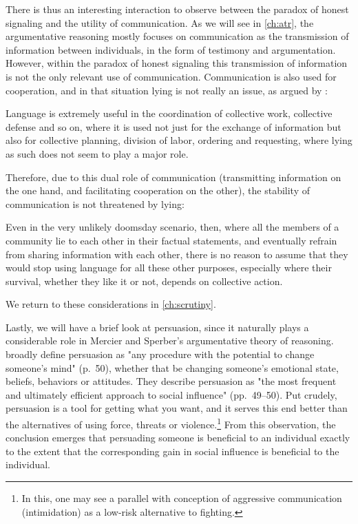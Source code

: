 There is thus an interesting interaction to observe between the paradox of honest signaling and the utility of communication. As we will see in \cref{ch:atr}, the argumentative reasoning mostly focuses on communication as the transmission of information between individuals, in the form of testimony and argumentation. However, within the paradox of honest signaling this transmission of information is not the only relevant use of communication. Communication is also used for cooperation, and in that situation lying is not really an issue, as argued by \citet{Dor17}:
\begin{quoting}
    Language is extremely useful in the coordination of collective work, collective defense and so on, where it is used not just for the exchange of information but also for collective planning, division of labor, ordering and requesting, where lying as such does not seem to play a major role.
\end{quoting}
Therefore, due to this dual role of communication (transmitting information on the one hand, and facilitating cooperation on the other), the stability of communication is not threatened by lying:
\begin{quoting}
    Even in the very unlikely doomsday scenario, then, where all the members of a community lie to each other in their factual statements, and eventually refrain from sharing information with each other, there is no reason to assume that they would stop using language for all these other purposes, especially where their survival, whether they like it or not, depends on collective action.
\end{quoting}
We return to these considerations in \cref{ch:scrutiny}.

Lastly, we will have a brief look at persuasion, since it naturally plays a considerable role in Mercier and Sperber's argumentative theory of reasoning.
\citet{Brinol09} broadly define persuasion as "any procedure with the potential to change someone's mind" (p.~50),
whether that be changing someone's emotional state, beliefs, behaviors or attitudes.
They describe persuasion as "the most frequent and ultimately efficient approach to social influence" (pp.~49--50). Put crudely, persuasion is a tool for getting what you want, and it serves this end better than the alternatives of using force, threats or violence.\footnote{In this, one may see a parallel with  conception of aggressive communication (intimidation) as a low-risk alternative to fighting.}
From this observation, the conclusion emerges that persuading someone is beneficial to an individual exactly to the extent that the corresponding gain in social influence is beneficial to the individual.
